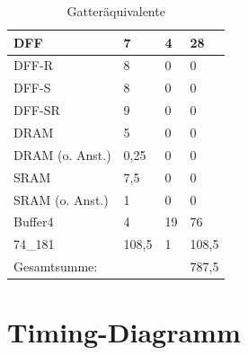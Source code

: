 \documentclass[11pt]{report}
\begin{document}
\begin{table}[]
\begin{tabular}{llll}
			\multicolumn{1}{|l|}{DFF}                    & \multicolumn{1}{l|}{7}     & \multicolumn{1}{l|}{4}  & \multicolumn{1}{l|}{28}    \\ \hline
			\multicolumn{1}{|l|}{DFF-R}                  & \multicolumn{1}{l|}{8}     & \multicolumn{1}{l|}{0}  & \multicolumn{1}{l|}{0}     \\ \hline
			\multicolumn{1}{|l|}{DFF-S}                  & \multicolumn{1}{l|}{8}     & \multicolumn{1}{l|}{0}  & \multicolumn{1}{l|}{0}     \\ \hline
			\multicolumn{1}{|l|}{DFF-SR}                 & \multicolumn{1}{l|}{9}     & \multicolumn{1}{l|}{0}  & \multicolumn{1}{l|}{0}     \\ \hline
			\multicolumn{1}{|l|}{DRAM}                   & \multicolumn{1}{l|}{5}     & \multicolumn{1}{l|}{0}  & \multicolumn{1}{l|}{0}     \\ \hline
			\multicolumn{1}{|l|}{DRAM (o. Anst.)}        & \multicolumn{1}{l|}{0,25}  & \multicolumn{1}{l|}{0}  & \multicolumn{1}{l|}{0}     \\ \hline
			\multicolumn{1}{|l|}{SRAM}                   & \multicolumn{1}{l|}{7,5}   & \multicolumn{1}{l|}{0}  & \multicolumn{1}{l|}{0}     \\ \hline
			\multicolumn{1}{|l|}{SRAM (o. Anst.)}        & \multicolumn{1}{l|}{1}     & \multicolumn{1}{l|}{0}  & \multicolumn{1}{l|}{0}     \\ \hline
			\multicolumn{1}{|l|}{Buffer4}                & \multicolumn{1}{l|}{4}     & \multicolumn{1}{l|}{19} & \multicolumn{1}{l|}{76}    \\ \hline
			\multicolumn{1}{|l|}{74\_181}                & \multicolumn{1}{l|}{108,5} & \multicolumn{1}{l|}{1}  & \multicolumn{1}{l|}{108,5} \\ \hline\hline
			Gesamtsumme:                                 &                            &                         & 787,5                      \\ \hline
		\end{tabular}
		\caption{Gatteräquivalente}
	\end{table}
	
	
	\section{Timing-Diagramm}
\end{document}
